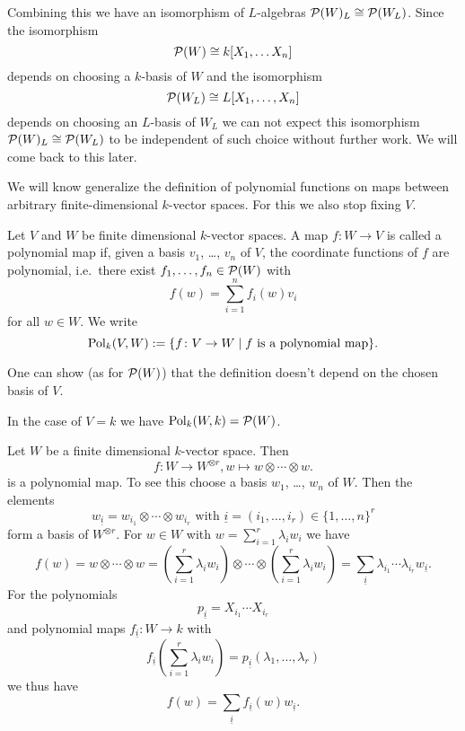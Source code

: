 Combining this we have an isomorphism of $L$-algebras $\mathcal{P}(W)_L \cong \mathcal{P}(W_L)$. Since the isomorphism
\[
 \mathcal{P}(W) \cong k[X_1, \dotsc X_n]
\]
depends on choosing a $k$-basis of $W$ and the isomorphism
\[
 \mathcal{P}(W_L) \cong L[X_1, \dotsc, X_n]
\]
depends on choosing an $L$-basis of $W_L$ we can not expect this isomorphism $\mathcal{P}(W)_L \cong \mathcal{P}(W_L)$ to be independent of such choice without further work. We will come back to this later.


We will know generalize the definition of polynomial functions on maps between arbitrary finite-dimensional $k$-vector spaces. For this we also stop fixing $V$.


\begin{defi}
 Let $V$ and $W$ be finite dimensional $k$-vector spaces. A map $f \colon W \to V$ is called a polynomial map if, given a basis $v_1$, \dots, $v_n$ of $V$, the coordinate functions of $f$ are polynomial, i.e.\ there exist $f_1, \dotsc, f_n \in \mathcal{P}(W)$ with
 \[
  f(w) = \sum_{i=1}^n f_i(w) v_i
 \]
 for all $w \in W$. We write
 \[
  \operatorname{Pol}_k(V,W) := \{f \colon V \to W \mid f \text{ is a polynomial map}\}.
 \]
\end{defi}


\begin{rem}
 One can show (as for $\mathcal{P}(W)$) that the definition doesn’t depend on the chosen basis of $V$.
\end{rem}


\begin{rem}
 In the case of $V = k$ we have $\operatorname{Pol}_k(W,k) = \mathcal{P}(W)$.
\end{rem}


\begin{expl}
 Let $W$ be a finite dimensional $k$-vector space. Then
 \[
  f \colon W \to W^{\otimes r}, w \mapsto w \otimes \dotsb \otimes w.
 \]
 is a polynomial map. To see this choose a basis $w_1$, \dots, $w_n$ of $W$. Then the elements
 \[
  w_{\underline{i}} = w_{i_1} \otimes \dotsb \otimes w_{i_r} \text{ with } \underline{i} = (i_1, \dotsc, i_r) \in \{1, \dotsc, n\}^r
 \]
 form a basis of $W^{\otimes r}$. For $w \in W$ with $w = \sum_{i=1}^r \lambda_i w_i$ we have
 \[
  f(w)
  = w \otimes \dotsb \otimes w
  = \left( \sum_{i=1}^r \lambda_i w_i \right) \otimes \dotsb \otimes \left( \sum_{i=1}^r \lambda_i w_i \right)
  = \sum_{\underline{i}} \lambda_{i_1} \dotsm \lambda_{i_r} w_{\underline{i}}.
 \]
 For the polynomials
 \[
  p_{\underline{i}} = X_{i_1} \dotsm X_{i_r}
 \]
 and polynomial maps $f_{\underline{i}} \colon W \to k$ with
 \[
  f_{\underline{i}}\left(\sum_{i=1}^r \lambda_i w_i\right) = p_{\underline{i}}(\lambda_1, \dotsc, \lambda_r)
 \]
 we thus have
 \[
  f(w) = \sum_{\underline{i}} f_{\underline{i}}(w) w_{\underline{i}}.
 \]
\end{expl}


